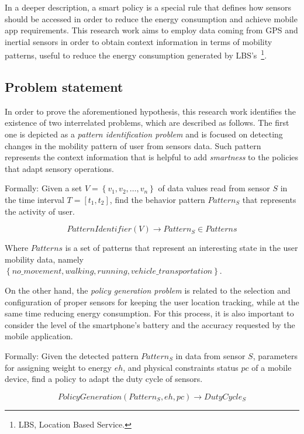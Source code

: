 \documentclass[ENG,PhD]{cinvestav}
\begin{document}
In a deeper description, a smart policy is a special rule that defines how sensors should be accessed in order to reduce the energy consumption and achieve mobile app requirements.
This research work aims to employ data coming from GPS and inertial sensors in order to obtain context information in terms of mobility patterns, useful to reduce the energy consumption generated by LBS's~\footnote{LBS, Location Based Service.}.


\subsection{Problem statement} 
\label{sub:problem_statement}
In order to prove the aforementioned hypothesis, this research work identifies the existence of two interrelated problems, which are described as follows.
The first one is depicted as a \emph{pattern identification problem} and is focused on detecting changes in the mobility pattern of user from sensors data.
Such pattern represents the context information that is helpful to add \emph{smartness} to the policies that adapt sensory operations.

Formally:
\label{ssub:pattern_identification}
Given a set $V = \left\{v_{1}, v_{2}, \dotsc, v_{n}\right\}$ of data values read from sensor $S$ in the time interval $T = [t_{1}, t_{2}]$, find the behavior pattern $Pattern_{S}$ that represents the activity of user.

\begin{equation}
  PatternIdentifier( V ) \longrightarrow{} Pattern_{S} \in Patterns
\end{equation}

Where $Patterns$ is a set of patterns that represent an interesting state in the user mobility data, namely $\left\{no\_movement, walking, running, vehicle\_transportation\right\}$.

On the other hand, the \emph{policy generation problem} is related to the selection and configuration of proper sensors for keeping the user location tracking, while at the same time reducing energy consumption.
For this process, it is also important to consider the level of the smartphone's battery and the accuracy requested by the mobile application.

Formally:
Given the detected pattern $Pattern_{S}$ in data from sensor $S$, parameters for assigning weight to energy $eh$, and physical constraints status $pc$ of a mobile device, find a policy to adapt the duty cycle of sensors.

\begin{equation}
  PolicyGeneration( Pattern_{S}, eh, pc ) \longrightarrow{} DutyCycle_{S}
\end{equation}
\end{document}
